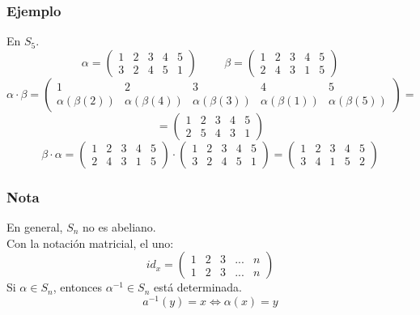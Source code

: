 \documentclass[11pt,a4paper]{article}
\begin{document}
\subsubsection*{Ejemplo}

En $S_{5}$.
\begin{equation*}
\alpha = 
\begin{pmatrix}
1 & 2 & 3 & 4 & 5 \\
3 & 2 & 4 & 5 & 1
\end{pmatrix}
\hspace{1cm}
\beta = 
\begin{pmatrix}
1 & 2 & 3 & 4 & 5 \\
2 & 4 & 3 & 1 & 5
\end{pmatrix}
\end{equation*}
\begin{equation*}
\alpha \cdot \beta = 
\begin{pmatrix}
1 & 2 & 3 & 4 & 5 \\
\alpha(\beta(2)) & \alpha(\beta(4)) & \alpha(\beta(3)) &\alpha(\beta(1)) & \alpha(\beta(5))
\end{pmatrix}
=
\end{equation*}
\begin{equation*}
=
\begin{pmatrix}
1 & 2 & 3 & 4 & 5 \\
2 & 5 & 4 & 3 & 1
\end{pmatrix}
\end{equation*}
\begin{equation*}
\beta \cdot \alpha =
\begin{pmatrix}
1 & 2 & 3 & 4 & 5\\
2 & 4 & 3 & 1 & 5
\end{pmatrix}
\cdot
\begin{pmatrix}
1 & 2 & 3 & 4 & 5 \\
3 & 2 & 4 & 5 & 1
\end{pmatrix}
=
\begin{pmatrix}
1 & 2 & 3 & 4 & 5 \\
3 & 4 & 1 & 5 & 2
\end{pmatrix}
\end{equation*}

\subsubsection*{Nota}

En general, $S_{n}$ no es abeliano. \\
Con la notación matricial, el uno:
\begin{equation*}
id_{x} =
\begin{pmatrix}
1 & 2 & 3 & ... & n \\
1 & 2 & 3 & ... & n
\end{pmatrix}
\end{equation*}
Si $\alpha \in S_{n}$, entonces $\alpha^{-1} \in S_{n}$ está determinada.
$$a^{-1}(y) = x \iff \alpha(x) = y$$
\end{document}
